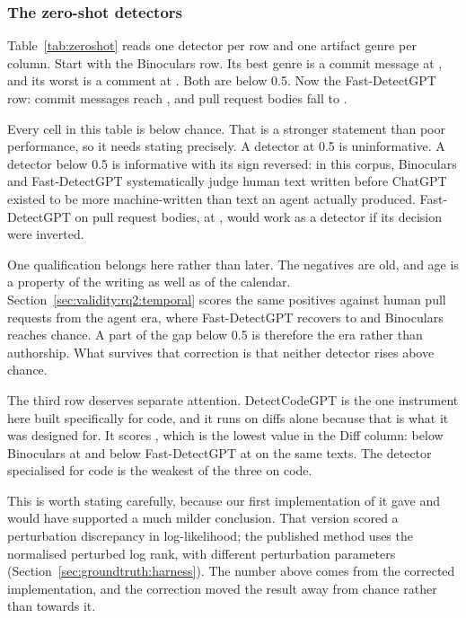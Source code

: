 \subsubsection{The zero-shot detectors}
\label{sec:validity:rq1:zeroshot}



Table~\ref{tab:zeroshot} reads one detector per row and one artifact genre per column.
Start with the Binoculars row. Its best genre is a commit message at
, and its worst is a comment at . Both are below 0.5.
Now the Fast-DetectGPT row: commit messages reach , and pull request
bodies fall to .

Every cell in this table is below chance. That is a stronger statement than poor
performance, so it needs stating precisely. A detector at 0.5 is
uninformative. A detector below 0.5 is informative with its sign reversed: in this
corpus, Binoculars and Fast-DetectGPT systematically judge human text written before
ChatGPT existed to be more machine-written than text an agent actually produced.
Fast-DetectGPT on pull request bodies, at , would work as a detector if
its decision were inverted.

One qualification belongs here rather than later. The negatives are old, and age is a
property of the writing as well as of the calendar.
Section~\ref{sec:validity:rq2:temporal} scores the same positives against human pull
requests from the agent era, where Fast-DetectGPT recovers to  and
Binoculars reaches chance. A part of the gap below 0.5 is therefore the era rather than
authorship. What survives that correction is that neither detector rises above chance.

The third row deserves separate attention. DetectCodeGPT is the one instrument here
built specifically for code, and it runs on diffs alone because that is what it was
designed for. It scores , which is the lowest value in the Diff column:
below Binoculars at  and below Fast-DetectGPT at  on the
same texts. The detector specialised for code is the weakest of the three on code.

This is worth stating carefully, because our first implementation of it gave
 and would have supported a much milder conclusion. That version scored
a perturbation discrepancy in log-likelihood; the published method uses the normalised
perturbed log rank, with different perturbation parameters
(Section~\ref{sec:groundtruth:harness}). The number above comes from the corrected
implementation, and the correction moved the result away from chance rather than
towards it.

